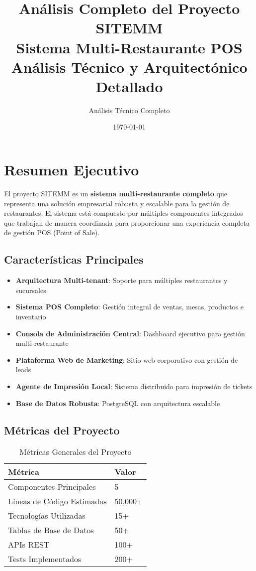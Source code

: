 \documentclass[12pt,a4paper]{article}
\title{\Huge\textbf{Análisis Completo del Proyecto SITEMM}\\[0.5cm]
\Large Sistema Multi-Restaurante POS\\[0.3cm]
\large Análisis Técnico y Arquitectónico Detallado}
\author{Análisis Técnico Completo}
\date{\today}
\begin{document}
\maketitle

\tableofcontents
\newpage

\section{Resumen Ejecutivo}

El proyecto SITEMM es un \textbf{sistema multi-restaurante completo} que representa una solución empresarial robusta y escalable para la gestión de restaurantes. El sistema está compuesto por múltiples componentes integrados que trabajan de manera coordinada para proporcionar una experiencia completa de gestión POS (Point of Sale).

\subsection{Características Principales}
\begin{itemize}[leftmargin=2cm]
    \item \textbf{Arquitectura Multi-tenant}: Soporte para múltiples restaurantes y sucursales
    \item \textbf{Sistema POS Completo}: Gestión integral de ventas, mesas, productos e inventario
    \item \textbf{Consola de Administración Central}: Dashboard ejecutivo para gestión multi-restaurante
    \item \textbf{Plataforma Web de Marketing}: Sitio web corporativo con gestión de leads
    \item \textbf{Agente de Impresión Local}: Sistema distribuido para impresión de tickets
    \item \textbf{Base de Datos Robusta}: PostgreSQL con arquitectura escalable
\end{itemize}

\subsection{Métricas del Proyecto}
\begin{table}[H]
\centering
\begin{tabular}{@{}ll@{}}
\toprule
\textbf{Métrica} & \textbf{Valor} \\
\midrule
Componentes Principales & 5 \\
Líneas de Código Estimadas & 50,000+ \\
Tecnologías Utilizadas & 15+ \\
Tablas de Base de Datos & 50+ \\
APIs REST & 100+ \\
Tests Implementados & 200+ \\
\bottomrule
\end{tabular}
\caption{Métricas Generales del Proyecto}
\end{table}
\end{document}
